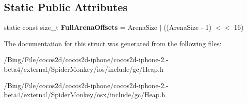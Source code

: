 \subsection*{Static Public Attributes}
\begin{DoxyCompactItemize}
\item 
\hypertarget{structjs_1_1gc_1_1_free_span_ad78cd8a574b8a95b799af8196e12a4d0}{static const size\-\_\-t {\bfseries Full\-Arena\-Offsets} = Arena\-Size $|$ ((Arena\-Size -\/ 1) $<$$<$ 16)}\label{structjs_1_1gc_1_1_free_span_ad78cd8a574b8a95b799af8196e12a4d0}

\end{DoxyCompactItemize}


The documentation for this struct was generated from the following files\-:\begin{DoxyCompactItemize}
\item 
/\-Bing/\-File/cocos2d/cocos2d-\/iphone/cocos2d-\/iphone-\/2.-\/beta4/external/\-Spider\-Monkey/ios/include/gc/Heap.\-h\item 
/\-Bing/\-File/cocos2d/cocos2d-\/iphone/cocos2d-\/iphone-\/2.-\/beta4/external/\-Spider\-Monkey/osx/include/gc/Heap.\-h\end{DoxyCompactItemize}
